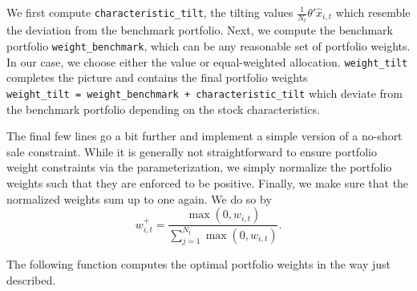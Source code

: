 \documentclass[
]{krantz}
\begin{document}
We first compute \texttt{characteristic\_tilt}, the tilting values \(\frac{1}{N_t}\theta'\hat{x}_{i, t}\) which resemble the deviation from the benchmark portfolio. Next, we compute the benchmark portfolio \texttt{weight\_benchmark}, which can be any reasonable set of portfolio weights. In our case, we choose either the value or equal-weighted allocation.
\texttt{weight\_tilt} completes the picture and contains the final portfolio weights \texttt{weight\_tilt\ =\ weight\_benchmark\ +\ characteristic\_tilt} which deviate from the benchmark portfolio depending on the stock characteristics.

The final few lines go a bit further and implement a simple version of a no-short sale constraint. While it is generally not straightforward to ensure portfolio weight constraints via the parameterization, we simply normalize the portfolio weights such that they are enforced to be positive. Finally, we make sure that the normalized weights sum up to one again. We do so by\\
\[w_{i,t}^+ = \frac{\max(0, w_{i,t})}{\sum\limits_{j=1}^{N_t}\max(0, w_{i,t})}.\]

The following function computes the optimal portfolio weights in the way just described.
\end{document}
